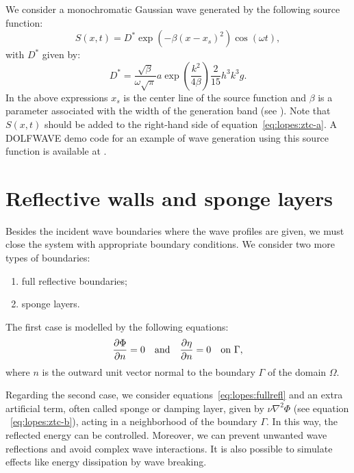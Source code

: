 We consider a monochromatic Gaussian wave generated by the following
source function:
\begin{equation}
  \label{eq:lopes:src}
  S(x,t)=D^* \exp(-\beta (x-x_s)^2)\cos(\omega t),
\end{equation}
with $D^*$ given by:
\begin{equation}
D^* = \frac{\sqrt{\beta}} {\omega\sqrt{\pi}} a
\exp(\frac{k^2}{4\beta})\frac{2}{15}h^3k^3g.
\end{equation}
In the above expressions $x_s$ is the center line of the source function
and $\beta$ is a parameter associated with the width of the generation
band (see \citet{WeiKirbySinha1999}).  Note that $S(x,t)$ should be added
to the right-hand side of equation~\eqref{eq:lopes:ztc-a}.  A DOLFWAVE
demo code for an example of wave generation using  this source function
is available at .

\section{Reflective walls and sponge layers}
\label{sec:lopes:boundaryconditions}

Besides the incident wave boundaries where the wave profiles are
given, we must close the system with appropriate boundary conditions.
We consider two more types of boundaries:
\begin{enumerate}
\item full reflective boundaries;
\item sponge layers.
\end{enumerate}
The first case is modelled by the following equations:
\begin{equation}\label{eq:lopes:fullrefl}
  \frac{\partial \Phi}{\partial n}=0\quad {\rm
    and}\quad\frac{\partial \eta}{\partial n}=0\quad {\rm
    on\,\, } \Gamma,
\end{equation}
where $n$ is the outward unit vector normal to the boundary
$\Gamma$ of the domain $\Omega$.

Regarding the second case, we consider equations~\eqref{eq:lopes:fullrefl}
and an extra artificial term, often called sponge 
or damping layer, given by $\nu\nabla^2\Phi$ (see equation
~\eqref{eq:lopes:ztc-b}), acting in a neighborhood of the boundary
$\Gamma$.  In this way, the reflected energy can be controlled. Moreover,
we can prevent unwanted wave reflections and avoid complex wave
interactions.  It is also possible to simulate effects like energy
dissipation by wave breaking.

